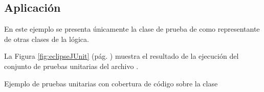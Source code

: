 \subsection{\forlnameref Aplicación}
\label{sec:applicationTests}

\begin{shaded}
En este ejemplo se presenta únicamente la clase de prueba de  como representante de otras clases de la lógica.
\end{shaded}


La Figura \ref{fig:eclipseJUnit} (pág. \pageref{fig:eclipseJUnit}) muestra el resultado de la ejecución del conjunto de pruebas unitarias del archivo .

\begin{landscape}
\centering
{}
\caption{Ejemplo de pruebas unitarias con cobertura de código sobre la clase }
\label{fig:eclipseJUnit}
\end{landscape}
